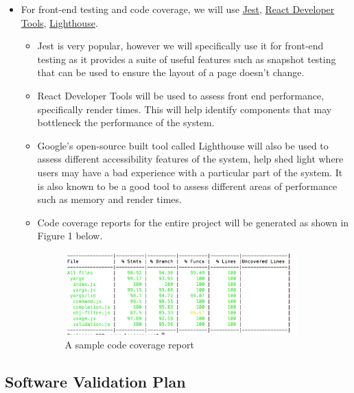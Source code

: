 \documentclass[12pt, titlepage]{article}
\begin{document}
\begin{itemize}
\item For front-end testing and code coverage, we will use \href{https://jestjs.io/}{Jest}, \href{https://react.dev/learn/react-developer-tools}{React Developer Tools}, \href{https://developer.chrome.com/docs/lighthouse/overview/}{Lighthouse}. 
\begin{itemize}    
    \item Jest is very popular, however we will specifically use it for front-end testing as it provides a suite of useful features such as snapshot testing that can be used to ensure the layout of a page doesn't change.
    \item React Developer Tools will be used to assess front end performance, specifically render times. This will help identify components that may bottleneck the performance of the system.  
    
    \item Google's open-source built tool called Lighthouse will also be used to assess different accessibility features of the system, help shed light where users may have a bad experience with a particular part of the system. It is also known to be a good tool to assess different areas of performance such as memory and render times.
    
\end{itemize}

\begin{itemize}
    \item Code coverage reports for the entire project will be generated as shown in Figure 1 below. \\
    \begin{figure}[H]
    \includegraphics[width=0.9\textwidth]{CodeCoverage}
    \caption{A sample code coverage report}
    \end{figure}
\end{itemize}
\end{itemize}

\subsection{Software Validation Plan}
\end{document}
